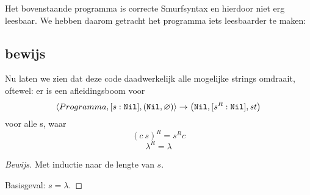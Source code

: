 Het bovenstaande programma is correcte Smurfsyntax en hierdoor niet erg
leesbaar. We hebben daarom getracht het programma iets leesbaarder te maken: 





\subsection{bewijs} 
Nu laten we zien dat deze code daadwerkelijk alle mogelijke strings omdraait,
oftewel: er is een afleidingsboom voor
$$
\left\langle Programma,[s:\texttt{Nil}],(\texttt{Nil},\varnothing)\right\rangle\to\left(\texttt{Nil},[s^R:\texttt{Nil}],\mathit{st}\right)
$$
voor alle s, waar
$$(c~s)^R=s^R c$$
$$\lambda^R=\lambda$$

\begin{proof}[Bewijs]
	Met inductie naar de lengte van $s$.

	Basisgeval: $s=\lambda$.

	
\end{proof}

